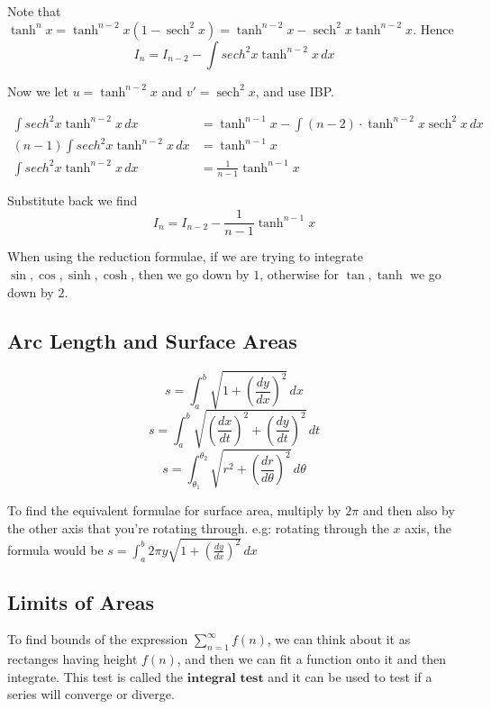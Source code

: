 \documentclass{article}
\newcommand{\f}[2]{\frac{#1}{#2}}
\DeclareMathOperator{\sech}{sech}
\newcommand{\dd}[2]{\frac{d #1}{d #2}}
\newcommand{\intg}[2]{\int #1 \, d#2}
\theoremstyle{mytheoremstyle}
\theoremstyle{mytheoremstyle}
\theoremstyle{myproblemstyle}
\theoremstyle{myproblemstyle}
\begin{document}
    Note that $\tanh^n{x} = \tanh^{n-2}{x}(1 - \sech^2{x}) = \tanh^{n-2}{x} - \sech^2{x}\tanh^{n-2}{x}$. Hence \[I_n = I_{n-2} - \intg{sech^2{x}\tanh^{n-2}{x}}{x}\]

    Now we let $u = \tanh^{n-2}{x}$ and $v' = \sech^2{x}$, and use IBP.

    \begin{align*}
        \intg{sech^2{x}\tanh^{n-2}{x}}{x} &= \tanh^{n-1}{x} - \intg{(n-2)\cdot \tanh^{n-2}{x}\sech^2{x}}{x}\\
        (n-1) \intg{sech^2{x}\tanh^{n-2}{x}}{x} &= \tanh^{n-1}{x}\\
        \intg{sech^2{x}\tanh^{n-2}{x}}{x} &= \f{1}{n-1}\tanh^{n-1}{x}
    \end{align*}

    Substitute back we find \[I_n = I_{n-2} - \f{1}{n-1}\tanh^{n-1}{x}\]

    \begin{theorem}
        When using the reduction formulae, if we are trying to integrate $\sin, \cos, \sinh, \cosh$, then we go down by $1$, otherwise for $\tan, \tanh$ we go down by $2$.
    \end{theorem}

    
    
    \subsection{Arc Length and Surface Areas}
        \begin{definition}
            \[s = \int_{a}^{b} \sqrt{1 + \left(\dd{y}{x}\right)^2} \, dx\]
            \[s = \int_{a}^{b} \sqrt{{\left(\dd{x}{t}\right)^2} + \left(\dd{y}{t}\right)^2} \, dt\]
            \[s = \int_{\theta_1}^{\theta_2} \sqrt{r^2 + \left(\dd{r}{\theta}\right)^2} \, d\theta\]
        \end{definition}

        To find the equivalent formulae for surface area, multiply by $2\pi$ and then also by the other axis that you're rotating through. e.g: rotating through the $x$ axis, the formula would be $s = \int_{a}^{b} 2\pi y \sqrt{1 + \left(\dd{y}{x}\right)^2} \, dx$


    \subsection{Limits of Areas}
    To find bounds of the expression $\displaystyle\sum_{n=1}^{\infty}f(n)$, we can think about it as rectanges having height $f(n)$, and then we can fit a function onto it and then integrate. This test is called the $\textbf{integral test}$ and it can be used to test if a series will converge or diverge.
\end{document}
